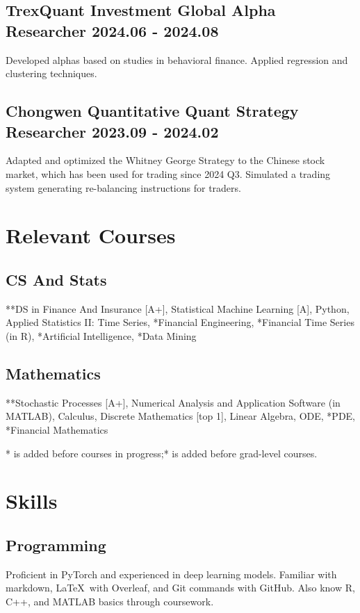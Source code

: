 \documentclass[10.5pt,a4paper]{article}
\newcommand{\mygray}{\color{lg}}
\begin{document}
\subsection{TrexQuant Investment \normalfont \hfill Global Alpha Researcher \hspace{40pt} 2024.06 - 2024.08}
Developed alphas based on studies in behavioral finance. Applied regression and clustering techniques.
\subsection{Chongwen Quantitative \normalfont\hfill Quant Strategy Researcher  \hspace{40pt} 2023.09 - 2024.02}
Adapted and optimized the Whitney George Strategy to the Chinese stock market, which has been used for trading since 2024 Q3. Simulated a trading system generating re-balancing instructions for traders.

\section{Relevant Courses}
\subsection{CS And Stats}
**DS in Finance And Insurance [A+], Statistical Machine Learning [A], Python, Applied Statistics II: Time Series, *Financial Engineering, *Financial Time Series (in R), *Artificial Intelligence, *Data Mining

\subsection{Mathematics} 
**Stochastic Processes [A+], Numerical Analysis and Application Software (in MATLAB), Calculus, Discrete Mathematics [top 1], Linear Algebra, ODE, *PDE, *Financial Mathematics

{\mygray
* is added before courses in progress;\hfill ** is added before grad-level courses.}
\section{Skills}

\subsection{Programming}
Proficient in PyTorch and experienced in deep learning models. Familiar with markdown, \LaTeX\ with Overleaf, and Git commands with  GitHub. Also know R, C++, and MATLAB basics through coursework.
\end{document}
